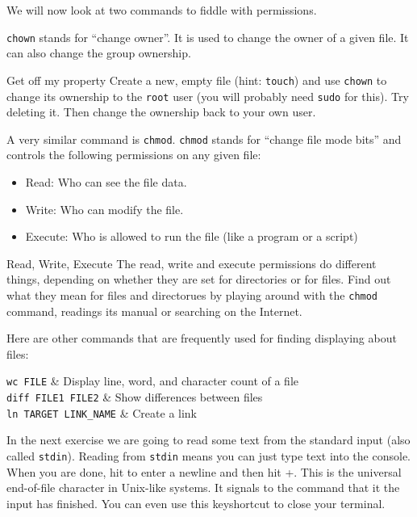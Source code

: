 \documentclass{TheAlternativeCourse}
\begin{document}
We will now look at two commands to fiddle with permissions.

\texttt{chown} stands for ``change owner''. It is used to change the owner of a
given file. It can also change the group ownership.

\begin{exercisebox}{Get off my property}
    Create a new, empty file (hint: \texttt{touch}) and use \texttt{chown} to
    change its ownership to the \texttt{root} user (you will probably need
    \texttt{sudo} for this). Try deleting it. Then change the ownership back to
    your own user.
\end{exercisebox}
%
A very similar command is \texttt{chmod}. \texttt{chmod} stands for ``change
file mode bits'' and controls the following permissions on any given file:

\begin{itemize}
	\item Read: Who can see the file data.
	\item Write: Who can modify the file.
	\item Execute: Who is allowed to run the file (like a program or a script)
\end{itemize}


\begin{exercisebox}{Read, Write, Execute}
	The read, write and execute permissions do different things, depending on whether they are set for directories or for files. Find out what they mean for files and directorues by playing around with the \texttt{chmod} command, readings its manual or searching on the Internet.
\end{exercisebox}
%
Here are other commands that are frequently used for finding displaying about files:

\begin{table}[H]
    \centering
    \begin{tcolorbox}[%
        enhanced,
        fuzzy shadow={1mm}{-1mm}{0mm}{0.1mm}{black!50!white},
        width=1.0\linewidth,
        tabularx={>{\centering\arraybackslash}l|>{\centering\arraybackslash}X},
        title={Commands for getting info about files}]
	    \texttt{wc FILE} & Display line, word, and character count of a file \\
	    \texttt{diff FILE1 FILE2} & Show differences between files\\
	    \texttt{ln TARGET LINK\_NAME} & Create a link\\
    \end{tcolorbox}%
    \label{tab5}
\end{table}
%
In the next exercise we are going to read some text from the standard input (also called \texttt{stdin}). Reading from \texttt{stdin} means you can just type text into the console. When you are done, hit  to enter a newline and then hit \keys{\ctrl}+. This is the universal end-of-file character in Unix-like systems. It signals to the command that it the input has finished. You can even use this keyshortcut to close your terminal.
\end{document}
